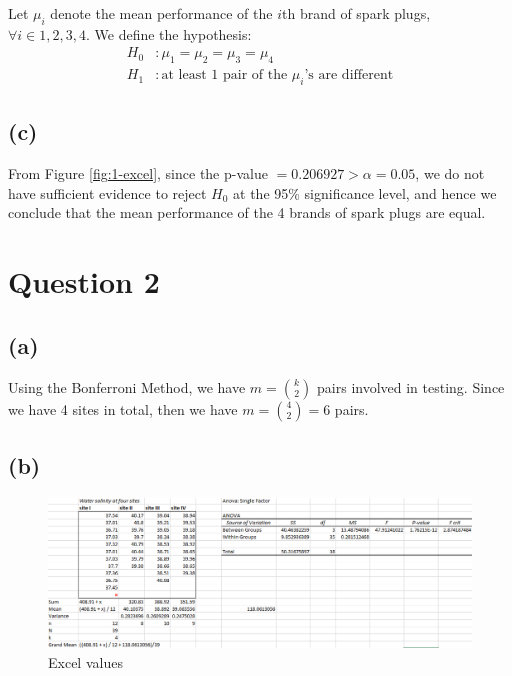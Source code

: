\documentclass[12pt]{article}
\begin{document}
Let $\mu_i$ denote the mean performance of the $i$th brand of spark plugs, $\forall i \in {1, 2, 3, 4}$. We define the hypothesis: \begin{align*}
    H_0 &: \mu_1 = \mu_2 = \mu_3 = \mu_4 \\ 
    H_1 &: \text{at least 1 pair of the } \mu_{i} \text{'s are different}
\end{align*}

\subsection*{(c)}

From Figure \ref{fig:1-excel}, since the p-value $= 0.206927 > \alpha = 0.05$, we do not have sufficient evidence to reject $H_0$ at the 95\% significance level, and hence we conclude that the mean performance of the 4 brands of spark plugs are equal. 

\newpage

\section*{Question 2}

\subsection*{(a)}

Using the Bonferroni Method, we have $m = \displaystyle \binom{k}{2}$ pairs involved in testing. Since we have 4 sites in total, then we have $m = \displaystyle\binom{4}{2} = 6$ pairs. 

\subsection*{(b)}

\begin{figure}[H]
    \centering
    \includegraphics[width=\textwidth]{Images/Q2water.png}
    \caption{Excel values}
    \label{fig:2-excel}
\end{figure} 
\end{document}
